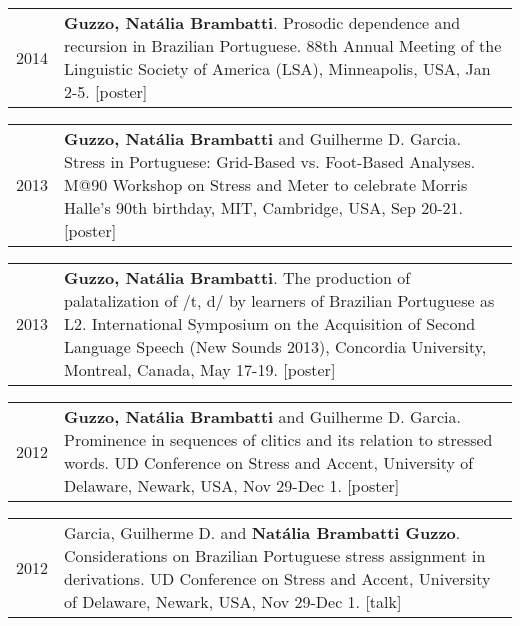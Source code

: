 \documentclass[letterpaper,10pt]{article}
\begin{document}
 
 \begin{tabular}{p{1cm}p{16cm}}
 2014   & \textbf{Guzzo, Nat\'alia Brambatti}. Prosodic dependence and recursion in Brazilian Portuguese. {88th Annual Meeting of the Linguistic Society of America (LSA)}, Minneapolis, USA, Jan 2-5. [poster]%
 \end{tabular}
 
 
 \begin{tabular}{p{1cm}p{16cm}}
 2013 & \textbf{Guzzo, Nat\'alia Brambatti} and Guilherme D. Garcia. Stress in Portuguese: Grid-Based vs. Foot-Based Analyses. {M@90 Workshop on Stress and Meter to celebrate Morris Halle's 90th birthday}, MIT, Cambridge, USA, Sep 20-21. [poster]%
 \end{tabular}
 
 
 \begin{tabular}{p{1cm}p{16cm}}
 2013   & \textbf{Guzzo, Nat\'alia Brambatti}. The production of palatalization of /t, d/ by learners of Brazilian Portuguese as L2. {International Symposium on the Acquisition of Second Language Speech (New Sounds 2013)}, Concordia University, Montreal, Canada, May 17-19. [poster]
 \end{tabular}
 
 
 \begin{tabular}{p{1cm}p{16cm}}
 2012   & \textbf{Guzzo, Nat\'alia Brambatti} and Guilherme D. Garcia. Prominence in sequences of clitics and its relation to stressed words. {UD Conference on Stress and Accent}, University of Delaware, Newark, USA, Nov 29-Dec 1. [poster]
 \end{tabular}
 
 
 \begin{tabular}{p{1cm}p{16cm}}
 2012   & Garcia, Guilherme D. and \textbf{Nat\'alia Brambatti Guzzo}. Considerations on Brazilian Portuguese stress assignment in derivations. {UD Conference on Stress and Accent}, University of Delaware, Newark, USA, Nov 29-Dec 1. [talk]
 \end{tabular}
 
 
\end{document}
